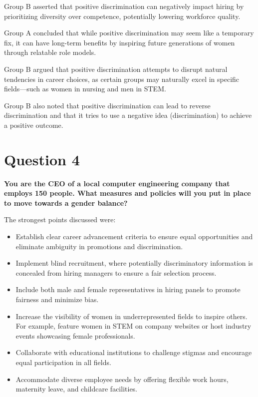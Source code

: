 \documentclass[12pt]{article}
\begin{document}
\noindent Group B asserted that positive discrimination can negatively impact hiring by prioritizing diversity over competence, potentially lowering workforce quality.  

\noindent Group A concluded that while positive discrimination may seem like a temporary fix, it can have long-term benefits by inspiring future generations of women through relatable role models.  

\noindent Group B argued that positive discrimination attempts to disrupt natural tendencies in career choices, as certain groups may naturally excel in specific fields—such as women in nursing and men in STEM.  

\noindent Group B also noted that positive discrimination can lead to reverse discrimination and that it tries to use a negative idea (discrimination) to achieve a positive outcome.

\section{Question 4}  
\textbf{You are the CEO of a local computer engineering company that employs 150 people. What measures and policies will you put in place to move towards a gender balance?}  

The strongest points discussed were:  
\begin{itemize}  
    \item Establish clear career advancement criteria to ensure equal opportunities and eliminate ambiguity in promotions and discrimination.  
    \item Implement blind recruitment, where potentially discriminatory information is concealed from hiring managers to ensure a fair selection process.  
    \item Include both male and female representatives in hiring panels to promote fairness and minimize bias.  
    \item Increase the visibility of women in underrepresented fields to inspire others. For example, feature women in STEM on company websites or host industry events showcasing female professionals.  
    \item Collaborate with educational institutions to challenge stigmas and encourage equal participation in all fields.  
    \item Accommodate diverse employee needs by offering flexible work hours, maternity leave, and childcare facilities.  
\end{itemize}  
\end{document}
